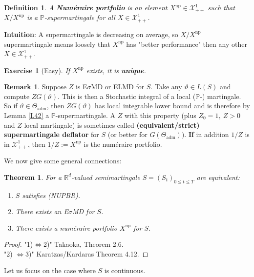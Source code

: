 \documentclass[12pt,a4paper, twoside]{article}
\newtheorem{thm}{Theorem}[section]
\newtheorem{defn}{Definition}[section]
\newtheorem{exe}{Exercise}[section]
\theoremstyle{definition}
\newtheorem{rem}{Remark}[section]
\newcommand{\PP}{\mathbb{P}} %
\begin{document}
\newpage
\begin{defn} A \textbf{Numéraire portfolio} is an element $X^\text{np} \in \mathcal{X}_{++}^1$ such that $X/X^\text{np}$ is a $\PP$-supermartingale for all $X \in \mathcal{X}_{++}^1$. 
\end{defn}
\noindent \textbf{Intuition}: A supermartingale is decreasing on average, so $X/X^\text{np}$ supermartingale means loosely that $X^\text{np}$ has "better performance" then any other $X \in \mathcal{X}_{++}^1$.
\begin{exe}[Easy] \label{ex18} If $X^\text{np}$ exists, it is \textbf{unique}.
\end{exe}
\begin{rem} Suppose $Z$ is E$\sigma$MD or ELMD for $S$. Take any $\vartheta \in L(S)$ and compute $ZG( \vartheta)$. This is then a Stochastic integral of a local ($\PP$-) martingale. So if $\vartheta \in \Theta_\text{adm}$, then $ZG( \vartheta)$ has local integrable lower bound and is therefore by Lemma \ref{L42} a $\PP$-supermartingale. A $Z$ with this property (plus $Z_0=1, \ Z >0$ and $Z$ local martingale) is sometimes called \textbf{(equivalent/strict)} \textbf{supermartingale deflator} for $S$ (or better for $G( \Theta_\text{adm}))$. \textbf{If} in addition $1/Z$ is in $\mathcal{X}_{++}^1$, then $1/Z:= X^\text{np}$ is the numéraire portfolio. 
\end{rem}
We now give some general connections:
\begin{thm} \label{T51} For a $\mathbb{R}^d$-valued semimartingale $S=(S_t)_{0 \leq t \leq T}$ are equivalent: 
\begin{enumerate}
\item $S$ satisfies (NUPBR).
\item There exists an E$\sigma$MD for $S$.
\item There exists a numéraire portfolio $X^\text{np}$ for $S$. 
\end{enumerate}
\end{thm}
\begin{proof}
"1)$\iff$2)" Takaoka, Theorem 2.6. \\
"2) $\iff$3)" Karatzas/Kardaras Theorem 4.12.
\end{proof}
Let us focus on the case where $S$ is continuous.
\end{document}
